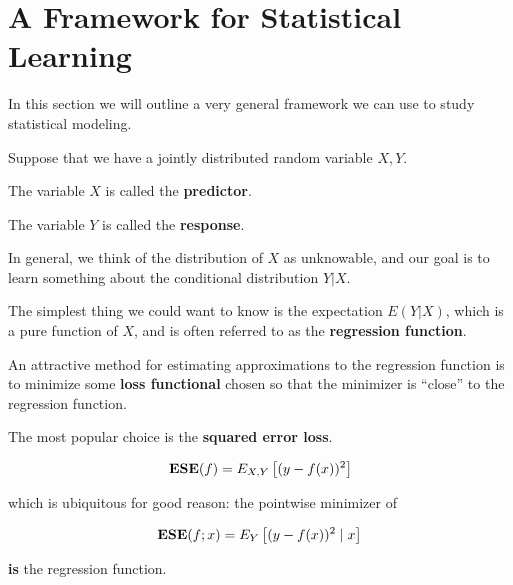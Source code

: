 \section{A Framework for Statistical Learning}
%
%
\begin{frame}
  In this section we will outline a very general framework we can use to study
  statistical modeling.
\end{frame}
%
%
\begin{frame}
  Suppose that we have a jointly distributed random variable $X, Y$.

  The variable $X$ is called the \textbf{predictor}.

  The variable $Y$ is called the \textbf{response}.
\end{frame}
%
%
\begin{frame}
  In general, we think of the distribution of $X$ as unknowable, and our goal is
  to learn something about the conditional distribution $Y|X$.
\end{frame}
%
%
\begin{frame}
  The simplest thing we could want to know is the expectation $E(Y|X)$, which is
  a pure function of $X$, and is often referred to as the \textbf{regression
  function}.
\end{frame}
%
%
\begin{frame}
  An attractive method for estimating approximations to the regression function
  is to minimize some \textbf{loss functional} chosen so that the minimizer is
  ``close'' to the regression function.
\end{frame}
%
%
\begin{frame}
  The most popular choice is the \textbf{squared error loss}.  
  
  $$ \operatorname*{\mathbf{ESE}}(f) = E_{X, Y} \left[ (y - f(x))^2 \right] $$

  which is ubiquitous for good reason: the pointwise minimizer of
  
  $$ \operatorname*{\mathbf{ESE}}(f; x) = E_Y \left[ (y - f(x))^2 \mid x \right] $$
  
  \textbf{is} the regression function.
\end{frame}
%
%
